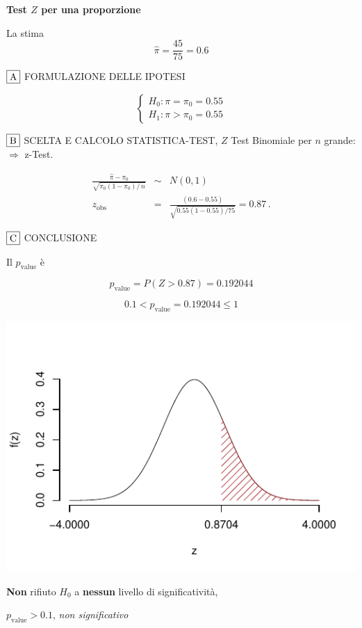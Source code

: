 \documentclass[
  11pt,
]{book}
\theoremstyle{mytheoremstyle}
\theoremstyle{mydefstyle}
\newenvironment{sol}
  {
  \begin{tcolorbox}[enhanced,breakable,arc=0.1mm,boxrule=1pt,colback=white,colframe=iblue,
  title=\bf \fontfamily{lmss}\selectfont \hspace{.5 cm} Soluzione,drop fuzzy shadow]

}{
\end{tcolorbox}
  }
\begin{document}
\begin{sol}
\textbf{Test \(Z\) per una proporzione}

La stima
\[\hat\pi=\frac { 45 } { 75 }= 0.6  \]

\(\fbox{A}\) FORMULAZIONE DELLE IPOTESI

\[\begin{cases}
   H_0: \pi = \pi_0=0.55 \\
   H_1: \pi > \pi_0=0.55 
   \end{cases}\]

\(\fbox{B}\) SCELTA E CALCOLO STATISTICA-TEST, \(Z\)
Test Binomiale per \(n\) grande: \(\Rightarrow\) z-Test.

\begin{eqnarray*}
   \frac{\hat\pi - \pi_{0}} {\sqrt {\pi_0(1-\pi_0)/\,n}}&\sim&N(0,1)\\
   z_{\text{obs}}
   &=& \frac{ ( 0.6 -  0.55 )} {\sqrt{ 0.55 (1- 0.55 )/ 75 }}
   =   0.87 \,.
   \end{eqnarray*}

\(\fbox{C}\) CONCLUSIONE

Il \(p_{\text{value}}\) è

\[ p_{\text{value}} = P(Z>0.87)=0.192044 \]

\[
 0.1 < p_\text{value}= 0.192044 \leq 1 
\]

\begin{center}\includegraphics{Esami_passati_con_soluzioni_files/figure-latex/2022-61-1} \end{center}

\textbf{Non} rifiuto \(H_0\) a \textbf{nessun}
livello di significatività,

\(p_\text{value}>0.1\),
\emph{non significativo}

\end{sol}
\end{document}
